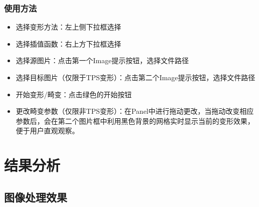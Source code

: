 \documentclass[UTF8]{ctexart}
\begin{document}
\subsubsection{使用方法}
\begin{itemize}
\item 选择变形方法：左上侧下拉框选择
\item 选择插值函数：右上方下拉框选择
\item 选择源图片：点击第一个Image提示按钮，选择文件路径
\item 选择目标图片（仅限于TPS变形）：点击第二个Image提示按钮，选择文件路径
\item 开始变形/畸变：点击绿色的开始按钮
\item 更改畸变参数（仅限非TPS变形）：在Panel中进行拖动更改，当拖动改变相应参数后，会在第二个图片框中利用黑色背景的网格实时显示当前的变形效果，便于用户直观观察。
\end{itemize}


\section{结果分析}

\subsection{图像处理效果}
\end{document}

